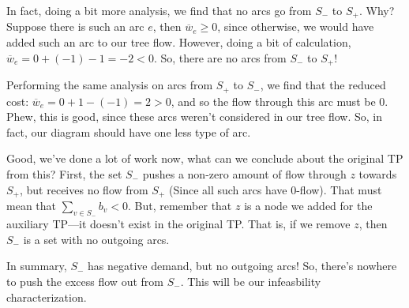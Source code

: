 In fact, doing a bit more analysis, we find that no arcs go from $S_-$ to $S_+$. Why?
Suppose there is such an arc $e$, then $\overline{w}_e \geq 0$, since otherwise, we would have added such an arc to our tree flow. 
However, doing a bit of calculation, $\overline{w}_e = 0 + (-1) - 1 = -2 < 0$. So, there are no arcs from $S_-$ to $S_+$!

Performing the same analysis on arcs from $S_+$ to $S_-$, we find that the reduced cost:  $\overline{w}_e = 0 + 1 - (-1) = 2 > 0$, and so the flow through this arc must be $0$.
Phew, this is good, since these arcs weren't considered in our tree flow.
So, in fact, our diagram should have one less type of arc.

\begin{minipage}{\textwidth}
    \centering
\end{minipage}

Good, we've done a lot of work now, what can we conclude about the original TP from this?
First, the set $S_-$ pushes a non-zero amount of flow through $z$ towards $S_+$, but receives no flow from $S_+$ (Since all such arcs have $0$-flow). That must mean that $\sum_{v \in S_-} b_v < 0$. 
But, remember that $z$ is a node we added for the auxiliary TP---it doesn't exist in the original TP.
That is, if we remove $z$, then $S_-$ is a set with no outgoing arcs.

In summary, $S_-$ has negative demand, but no outgoing arcs! So, there's nowhere to push the excess flow out from $S_-$. This will be our infeasbility characterization.

